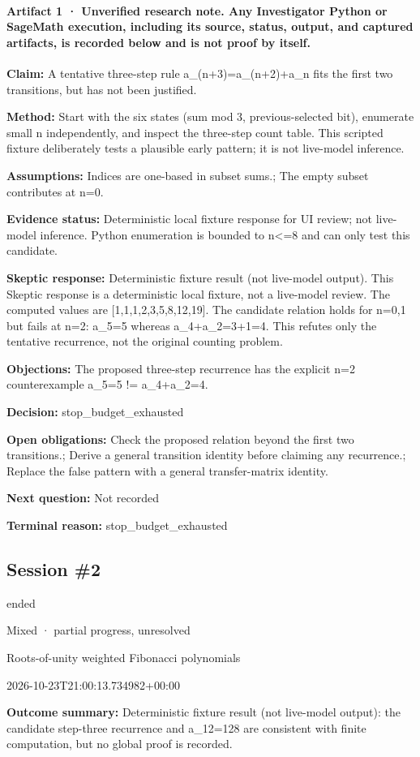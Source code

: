 \documentclass[11pt]{article}
\begin{document}
\paragraph{Artifact 1 · Unverified research note. Any Investigator Python or SageMath execution, including its source, status, output, and captured artifacts, is recorded below and is not proof by itself.}
\textbf{Claim:} A tentative three-step rule a\_(n+3)=a\_(n+2)+a\_n fits the first two transitions, but has not been justified.\par
\textbf{Method:} Start with the six states (sum mod 3, previous-selected bit), enumerate small n independently, and inspect the three-step count table. This scripted fixture deliberately tests a plausible early pattern; it is not live-model inference.\par
\textbf{Assumptions:} Indices are one-based in subset sums.; The empty subset contributes at n=0.\par
\textbf{Evidence status:} Deterministic local fixture response for UI review; not live-model inference. Python enumeration is bounded to n\textless{}=8 and can only test this candidate.\par
\textbf{Skeptic response:} Deterministic fixture result (not live-model output). This Skeptic response is a deterministic local fixture, not a live-model review. The computed values are [1,1,1,2,3,5,8,12,19]. The candidate relation holds for n=0,1 but fails at n=2: a\_5=5 whereas a\_4+a\_2=3+1=4. This refutes only the tentative recurrence, not the original counting problem.\par
\textbf{Objections:} The proposed three-step recurrence has the explicit n=2 counterexample a\_5=5 != a\_4+a\_2=4.\par
\textbf{Decision:} stop\_budget\_exhausted\par
\textbf{Open obligations:} Check the proposed relation beyond the first two transitions.; Derive a general transition identity before claiming any recurrence.; Replace the false pattern with a general transfer-matrix identity.\par
\textbf{Next question:} Not recorded\par
\textbf{Terminal reason:} stop\_budget\_exhausted\par
\subsection{Session \#2}
\begin{description}[style=nextline,font=\normalfont\bfseries,leftmargin=0pt,labelsep=0pt]
\item[Execution status] ended
\item[Outcome] Mixed · partial progress, unresolved
\item[Strategy] Roots-of-unity weighted Fibonacci polynomials
\item[Started] 2026-10-23T21:00:13.734982+00:00
\end{description}
\textbf{Outcome summary:} Deterministic fixture result (not live-model output): the candidate step-three recurrence and a\_12=128 are consistent with finite computation, but no global proof is recorded.\par
\end{document}
